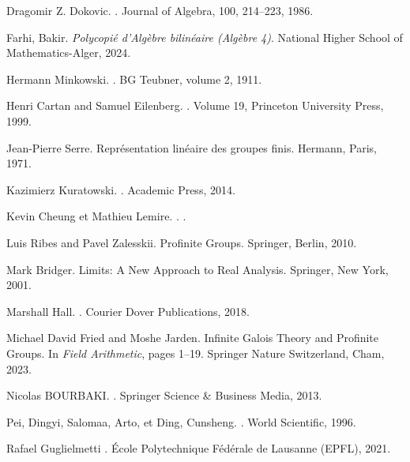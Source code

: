\documentclass[a4paper, 14pt]{report}
\begin{document}
\begin{onehalfspace}
{\begin{thebibliography}{99}
	
	Dragomir Z. Dokovic.
	.
	\newblock Journal of Algebra, 100, 214--223, 1986.
	
	Farhi, Bakir.
	\newblock \textit{Polycopié d'Algèbre bilinéaire (Algèbre 4)}.
	\newblock National Higher School of Mathematics-Alger, 2024.
	
	
	Hermann Minkowski.
	.
	\newblock BG Teubner, volume 2, 1911.
	
	Henri Cartan and Samuel Eilenberg.
	.
	\newblock Volume 19, Princeton University Press, 1999.
	
	Jean-Pierre Serre.
	\newblock Repr{\'e}sentation lin{\'e}aire des groupes finis.
	\newblock Hermann, Paris, 1971.
	
	Kazimierz Kuratowski.  
	.  
	\newblock Academic Press, 2014.
	
	Kevin  Cheung et Mathieu Lemire.
	.
	.
	
	
	Luis Ribes and Pavel Zalesskii.
	\newblock Profinite Groups.
	\newblock Springer, Berlin, 2010.

	
	Mark  Bridger.
	\newblock Limits: A New Approach to Real Analysis.
	\newblock Springer, New York, 2001.
	
	Marshall Hall.
	.
	\newblock Courier Dover Publications, 2018.
	
		
	Michael David Fried and Moshe Jarden.
	\newblock Infinite Galois Theory and Profinite Groups.
	\newblock In {\em Field Arithmetic}, pages 1--19. Springer Nature Switzerland, Cham, 2023.
	
	Nicolas BOURBAKI. 
	.
	\newblock Springer Science \& Business Media, 2013.
	
	Pei, Dingyi, Salomaa, Arto, et Ding, Cunsheng.
	.
	\newblock World Scientific, 1996.
	
	Rafael Guglielmetti  
	.  
	\newblock École Polytechnique Fédérale de Lausanne (EPFL), 2021. 
	

\end{thebibliography}}
\end{onehalfspace}
\end{document}
